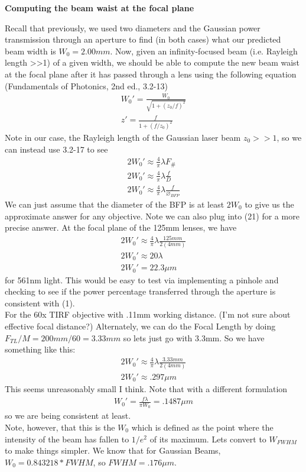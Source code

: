 \newpage
\begin{center}
    \textbf{Computing the beam waist at the focal plane}
\end{center}
Recall that previously, we used two diameters and the Gaussian power transmission through an aperture to find (in both cases) what our predicted beam width is $W_0=2.00mm$. Now, given an infinity-focused beam (i.e. Rayleigh length >>1) of a given width, we should be able to compute the new beam waist at the focal plane after it has passed through a lens using the following equation (Fundamentals of Photonics, 2nd ed., 3.2-13)
\begin{gather}
    W_0'= \frac{W_0}{\sqrt{1+(z_0/f)^2}}\\
    z' = \frac{f}{1+(f/z_0)^2}
\end{gather}
Note in our case, the Rayleigh length of the Gaussian laser beam $z_0>>1$, so we can instead use 3.2-17 to see
\begin{gather}
    2W_0' \approx \frac 4 \pi \lambda F_\#\\
    2W_0' \approx \frac 4 \pi \lambda \frac f D\\
    2W_0' \approx \frac 4 \pi \lambda \frac f {\diameter_{BFP}}
\end{gather}
We can just assume that the diameter of the BFP is at least $2W_0$ to give us the approximate answer for any objective. Note we can also plug into (21) for a more precise answer.
At the focal plane of the 125mm lenses, we have
\begin{gather}
    2W_0' \approx \frac 4 \pi \lambda \frac{125mm}{2(4mm)}\\
    2W_0' \approx 20 \lambda\\
    2W_0' = 22.3 \mu m
\end{gather}
for 561nm light. This would be easy to test via implementing a pinhole and checking to see if the power percentage transferred through the aperture is consistent with (1).\\
For the 60x TIRF objective with .11mm working distance.  (I'm not sure about effective focal distance?) Alternately, we can do the Focal Length by doing $F_{TL}/M = 200mm/60 = 3.33mm$ so lets just go with 3.3mm. So we have something like this:
\begin{gather}
    2W_0' \approx \frac 4 \pi \lambda \frac{3.33mm}{2(4mm)}\\
    2W_0' \approx .297 \mu m
\end{gather}
This seems unreasonably small I think. Note that with a different formulation
\begin{gather}
    W_0' = \frac{f \lambda }{\pi W_0} = .1487\mu m
\end{gather}
so we are being consistent at least.\\
Note, however, that this is the $W_0$ which is defined as the point where the intensity of the beam has fallen to $1/e^2$ of its maximum. Lets convert to $W_{FWHM}$ to make things simpler. We know that for Gaussian Beams, $W_0=0.843218*FWHM$, so $FWHM = .176\mu m$.

